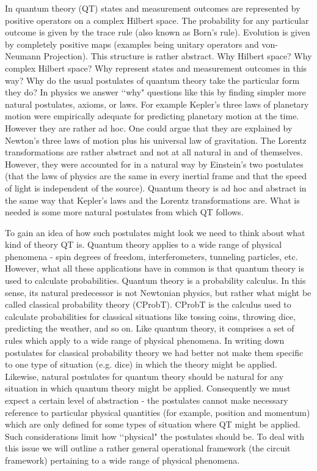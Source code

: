 \documentclass[10pt]{article}
\begin{document}
In quantum theory (QT) states and measurement outcomes are represented by positive operators on a complex Hilbert
space.  The probability for any particular outcome is given by the trace rule (also known as Born's rule).  Evolution is given by completely
positive maps (examples being unitary operators and von-Neumann Projection).  This structure is rather abstract. Why
Hilbert space? Why complex Hilbert space? Why represent states and measurement outcomes in this way?  Why do the usual
postulates of quantum theory take the particular form they do? In physics we answer \lq\lq why" questions like this by finding simpler
more natural postulates, axioms, or laws. For example Kepler's three laws of planetary motion were empirically
adequate for predicting planetary motion at the time.  However they are rather ad hoc.  One could argue that they are explained by
Newton's three laws of motion plus his universal law of gravitation.  The Lorentz transformations are rather abstract
and not at all natural in and of themselves. However, they were accounted for in a natural way by Einstein's two
postulates (that the laws of physics are the same in every inertial frame and that the speed of light is independent
of the source).  Quantum theory is ad hoc and abstract in the same way that Kepler's laws and the Lorentz
transformations are.  What is needed is some more natural postulates from which QT follows.

To gain an idea of how such postulates might look we need to think about what kind of theory QT is. Quantum theory
applies to a wide range of physical phenomena - spin degrees of freedom, interferometers, tunneling particles, etc.
However, what all these applications have in common is that quantum theory is used to calculate probabilities. Quantum
theory is a probability calculus.  In this sense, its natural predecessor is not Newtonian physics, but
rather what might be called classical probability theory (CProbT).  CProbT is the calculus used to calculate
probabilities for classical situations like tossing coins, throwing dice, predicting the weather, and so on.  Like
quantum theory, it comprises a set of rules which apply to a wide range of physical phenomena.  In writing down
postulates for classical probability theory we had better not make them specific to one type of situation (e.g. dice)
in which the theory might be applied.  Likewise, natural postulates for quantum theory should be natural for any
situation in which quantum theory might be applied.  Consequently we must expect a certain level of
abstraction - the postulates cannot make necessary reference to particular physical quantities (for example, position and momentum) which are only defined for some types of situation where QT might be applied.  Such considerations limit how \lq\lq physical" the postulates should be.  To deal with this issue we will outline a rather general operational framework (the circuit framework) pertaining to a wide range of physical phenomena.
\end{document}
